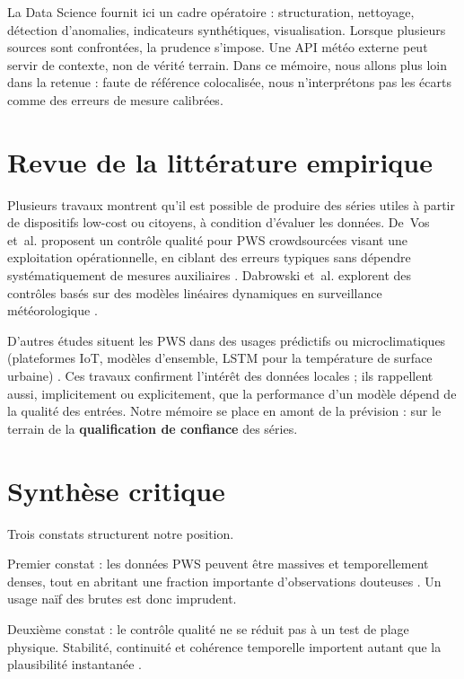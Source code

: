 \documentclass[12pt,a4paper]{report}
\begin{document}
La Data Science fournit ici un cadre opératoire : structuration, nettoyage,
détection d'anomalies, indicateurs synthétiques, visualisation. Lorsque plusieurs
sources sont confrontées, la prudence s'impose. Une API météo externe peut
servir de contexte, non de vérité terrain. Dans ce mémoire, nous allons plus
loin dans la retenue : faute de référence colocalisée, nous n'interprétons pas
les écarts comme des erreurs de mesure calibrées.

\section{Revue de la littérature empirique}

Plusieurs travaux montrent qu'il est possible de produire des séries utiles à
partir de dispositifs low-cost ou citoyens, à condition d'évaluer les données.
De~Vos et~al. proposent un contrôle qualité pour PWS crowdsourcées visant une
exploitation opérationnelle, en ciblant des erreurs typiques sans dépendre
systématiquement de mesures auxiliaires \cite{devos2019qc}. Dabrowski et~al.
explorent des contrôles basés sur des modèles linéaires dynamiques en
surveillance météorologique \cite{dabrowski2022qc}.

D'autres études situent les PWS dans des usages prédictifs ou microclimatiques
(plateformes IoT, modèles d'ensemble, LSTM pour la température de surface
urbaine)
\cite{moon2017microclimate,chithrakumar2023microclimate,yu2021lstm,ordu2025hybrid}.
Ces travaux confirment l'intérêt des données locales ; ils rappellent aussi,
implicitement ou explicitement, que la performance d'un modèle dépend de la
qualité des entrées. Notre mémoire se place en amont de la prévision : sur le
terrain de la \textbf{qualification de confiance} des séries.

\section{Synthèse critique}

Trois constats structurent notre position.

Premier constat : les données PWS peuvent être massives et temporellement
denses, tout en abritant une fraction importante d'observations douteuses
\cite{devos2019qc,teh2020sensor}. Un usage naïf des brutes est donc
imprudent.

Deuxième constat : le contrôle qualité ne se réduit pas à un test de plage
physique. Stabilité, continuité et cohérence temporelle importent autant que
la plausibilité instantanée \cite{dabrowski2022qc,teh2020sensor}.
\end{document}
